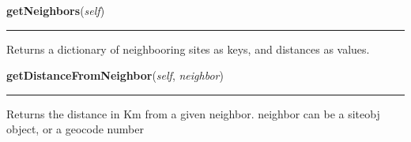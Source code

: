     \label{Epigrass:simobj:siteobj:getNeighbors}

    \vspace{0.5ex}

    \begin{boxedminipage}{\textwidth}

    \raggedright \textbf{getNeighbors}(\textit{self})

    \vspace{-1.5ex}

    \rule{\textwidth}{0.5\fboxrule}
    Returns a dictionary of neighbooring sites as keys, and distances as 
    values.

    \vspace{1ex}

    \end{boxedminipage}

    \label{Epigrass:simobj:siteobj:getDistanceFromNeighbor}

    \vspace{0.5ex}

    \begin{boxedminipage}{\textwidth}

    \raggedright \textbf{getDistanceFromNeighbor}(\textit{self}, \textit{neighbor})

    \vspace{-1.5ex}

    \rule{\textwidth}{0.5\fboxrule}
    Returns the distance in Km from a given neighbor. neighbor can be a 
    siteobj object, or a geocode number

    \vspace{1ex}

    \end{boxedminipage}

    \label{Epigrass:simobj:siteobj:getDegree}

    \vspace{0.5ex}


